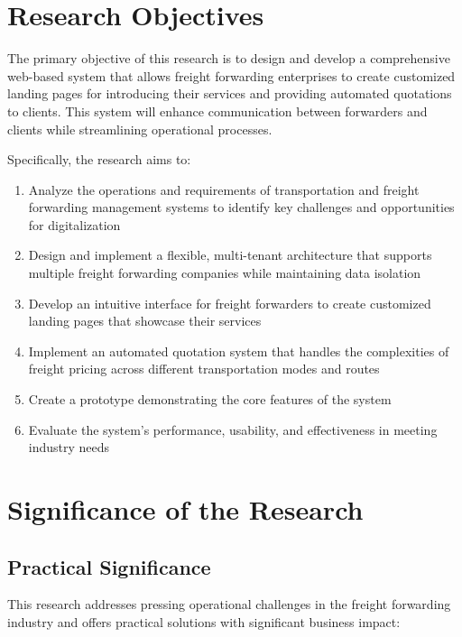 \section{Research Objectives}

The primary objective of this research is to design and develop a comprehensive web-based system that allows freight forwarding enterprises to create customized landing pages for introducing their services and providing automated quotations to clients. This system will enhance communication between forwarders and clients while streamlining operational processes.

Specifically, the research aims to:

\begin{enumerate}
    \item Analyze the operations and requirements of transportation and freight forwarding management systems to identify key challenges and opportunities for digitalization
    \item Design and implement a flexible, multi-tenant architecture that supports multiple freight forwarding companies while maintaining data isolation
    \item Develop an intuitive interface for freight forwarders to create customized landing pages that showcase their services
    \item Implement an automated quotation system that handles the complexities of freight pricing across different transportation modes and routes
    \item Create a prototype demonstrating the core features of the system
    \item Evaluate the system's performance, usability, and effectiveness in meeting industry needs
\end{enumerate}

\section{Significance of the Research}

\subsection{Practical Significance}

This research addresses pressing operational challenges in the freight forwarding industry and offers practical solutions with significant business impact:

